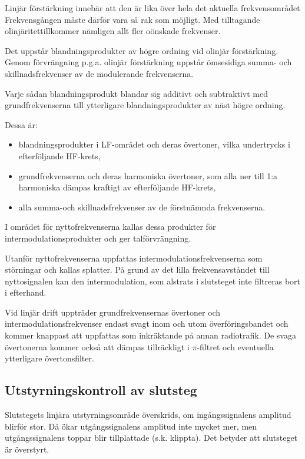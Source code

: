 Linjär förstärkning innebär att den är lika över hela det aktuella
frekvensområdet Frekvensgången måste därför vara så rak som
möjligt. Med tilltagande olinjäritettillkommer nämligen allt fler
oönskade frekvenser.

Det uppstår blandningsprodukter av högre ordning vid olinjär
förstärkning. Genom förvrängning p.g.a. olinjär förstärkning uppstår
ömsesidiga summa- och skillnadsfrekvenser av de modulerande
frekvenserna.

Varje sådan blandningsprodukt blandar sig additivt och subtraktivt med
grundfrekvenserna till ytterligare blandningsprodukter av näst högre
ordning.

Dessa är:
\begin{itemize}
\item blandningsprodukter i LF-området och deras övertoner, vilka
  undertrycks i efterföljande HF-krets,

\item grundfrekvenserna och deras harmoniska övertoner, som alla ner
  till 1:a harmoniska dämpas kraftigt av efterföljande HF-krets,

\item alla summa-och skillnadsfrekvenser av de förstnämnda frekvenserna.
\end{itemize}

I området för nyttofrekvenserna kallas dessa produkter för
intermodulationsprodukter och ger talförvrängning.

Utanför nyttofrekvenserna uppfattas intermodulationsfrekvenserna som
störningar och kallas splatter. På grund av det lilla
frekvensavståndet till nyttosignalen kan den intermodulation, som
alstrats i slutsteget inte filtreras bort i efterhand.

Vid linjär drift uppträder grundfrekvensernas övertoner och
intermodulationsfrekvenser endast svagt inom och utom
överföringsbandet och kommer knappast att uppfattas som inkräktande på
annan radiotrafik. De svaga övertonerna kommer också att dämpas
tillräckligt i \(\pi \)-filtret och eventuella ytterligare övertonsfilter.


\subsection{Utstyrningskontroll av slutsteg}

Slutstegets linjära utstyrningsområde överskrids, om ingångssignalens
amplitud blirför stor. Då ökar utgångssignalens amplitud inte mycket
mer, men utgångssignalens toppar blir tillplattade (s.k. klippta). Det
betyder att slutsteget är överstyrt.

